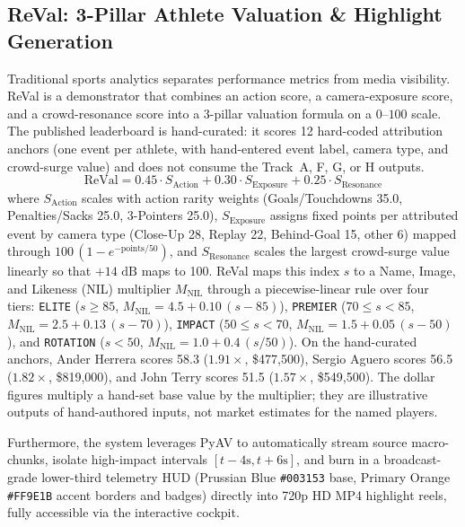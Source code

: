 \documentclass[10pt,twocolumn,letterpaper]{article}
\begin{document}
\subsection{ReVal: 3-Pillar Athlete Valuation \& Highlight Generation}
Traditional sports analytics separates performance metrics from media visibility. ReVal is a demonstrator that combines an action score, a camera-exposure score, and a crowd-resonance score into a 3-pillar valuation formula on a $0\text{--}100$ scale. The published leaderboard is hand-curated: it scores 12 hard-coded attribution anchors (one event per athlete, with hand-entered event label, camera type, and crowd-surge value) and does not consume the Track~A, F, G, or H outputs.
\begin{equation}
    \text{ReVal} = 0.45 \cdot S_{\text{Action}} + 0.30 \cdot S_{\text{Exposure}} + 0.25 \cdot S_{\text{Resonance}}
\end{equation}
where $S_{\text{Action}}$ scales with action rarity weights (Goals/Touchdowns 35.0, Penalties/Sacks 25.0, 3-Pointers 25.0), $S_{\text{Exposure}}$ assigns fixed points per attributed event by camera type (Close-Up 28, Replay 22, Behind-Goal 15, other 6) mapped through $100\,(1 - e^{-\text{points}/50})$, and $S_{\text{Resonance}}$ scales the largest crowd-surge value linearly so that $+14\text{ dB}$ maps to 100.
ReVal maps this index $s$ to a Name, Image, and Likeness (NIL) multiplier $M_{\text{NIL}}$ through a piecewise-linear rule over four tiers: \texttt{ELITE} ($s \ge 85$, $M_{\text{NIL}} = 4.5 + 0.10\,(s-85)$), \texttt{PREMIER} ($70 \le s < 85$, $M_{\text{NIL}} = 2.5 + 0.13\,(s-70)$), \texttt{IMPACT} ($50 \le s < 70$, $M_{\text{NIL}} = 1.5 + 0.05\,(s-50)$), and \texttt{ROTATION} ($s < 50$, $M_{\text{NIL}} = 1.0 + 0.4\,(s/50)$). On the hand-curated anchors, Ander Herrera scores 58.3 ($1.91\times$, \$477,500), Sergio Aguero scores 56.5 ($1.82\times$, \$819,000), and John Terry scores 51.5 ($1.57\times$, \$549,500).
The dollar figures multiply a hand-set base value by the multiplier; they are illustrative outputs of hand-authored inputs, not market estimates for the named players.

Furthermore, the system leverages PyAV to automatically stream source macro-chunks, isolate high-impact intervals $[t-4\text{s}, t+6\text{s}]$, and burn in a broadcast-grade lower-third telemetry HUD (Prussian Blue \texttt{\#003153} base, Primary Orange \texttt{\#FF9E1B} accent borders and badges) directly into 720p HD MP4 highlight reels, fully accessible via the interactive cockpit.
\end{document}
